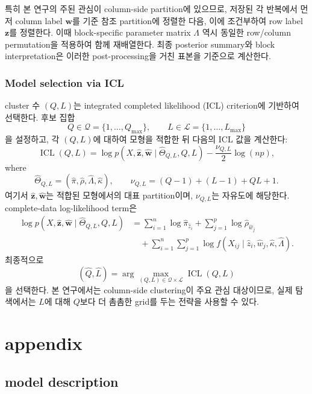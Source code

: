 \documentclass[A4paper,11pt]{article}
\begin{document}
특히 본 연구의 주된 관심이 column-side partition에 있으므로, 저장된 각 반복에서 먼저 column label $\mathbf{w}$를 기준 참조 partition에 정렬한 다음, 이에 조건부하여 row label $\mathbf{z}$를 정렬한다. 이때 block-specific parameter matrix $\Lambda$ 역시 동일한 row/column permutation을 적용하여 함께 재배열한다. 최종 posterior summary와 block interpretation은 이러한 post-processing을 거친 표본을 기준으로 계산한다.

\subsubsection{Model selection via ICL}

cluster 수 $(Q,L)$는 integrated completed likelihood (ICL) criterion에 기반하여 선택한다. 후보 집합
\[
Q \in \mathcal{Q}=\{1,\ldots,Q_{\max}\},
\qquad
L \in \mathcal{L}=\{1,\ldots,L_{\max}\}
\]
을 설정하고, 각 $(Q,L)$에 대하여 모형을 적합한 뒤 다음의 ICL 값을 계산한다:
\[
\operatorname{ICL}(Q,L)
=
\log p(X,\hat{\mathbf{z}},\hat{\mathbf{w}} \mid \hat{\Theta}_{Q,L},Q,L)
-
\frac{\nu_{Q,L}}{2}\log(np),
\]
where
\[
\hat{\Theta}_{Q,L}=(\hat{\pi},\hat{\rho},\hat{\Lambda},\hat{\kappa}),
\qquad
\nu_{Q,L}=(Q-1)+(L-1)+QL+1.
\]
여기서 $\hat{\mathbf{z}},\hat{\mathbf{w}}$는 적합된 모형에서의 대표 partition이며, $\nu_{Q,L}$는 자유도에 해당한다. complete-data log-likelihood term은
\begin{align*}
\log p(X,\hat{\mathbf{z}},\hat{\mathbf{w}} \mid \hat{\Theta}_{Q,L},Q,L)
&=
\sum_{i=1}^{n}\log \hat{\pi}_{\hat z_i}
+
\sum_{j=1}^{p}\log \hat{\rho}_{\hat w_j} \\
&\quad+
\sum_{i=1}^{n}\sum_{j=1}^{p}
\log f(X_{ij}\mid \hat z_i,\hat w_j,\hat\kappa,\hat\Lambda).
\end{align*}
최종적으로
\[
(\hat Q,\hat L)
=
\arg\max_{(Q,L)\in\mathcal{Q}\times\mathcal{L}}
\operatorname{ICL}(Q,L)
\]
을 선택한다. 본 연구에서는 column-side clustering이 주요 관심 대상이므로, 실제 탐색에서는 $L$에 대해 $Q$보다 더 촘촘한 grid를 두는 전략을 사용할 수 있다.


\section{appendix}

\subsection{model description}
\end{document}
